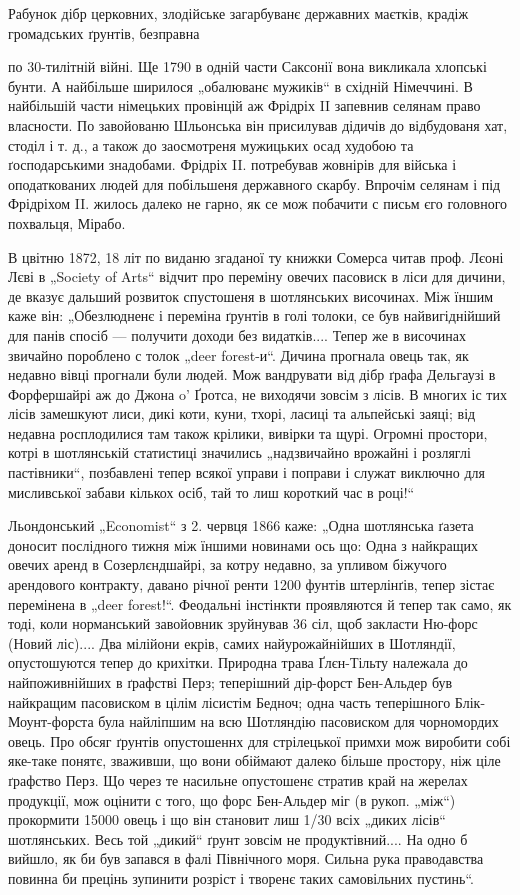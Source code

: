 Рабунок дібр церковних, злодійське загарбуванє державних маєтків, крадіж громадських ґрунтів,
безправна

по 30-тилітній війні. Ще 1790 в одній части Саксонії вона викликала хлопські бунти. А найбільше
ширилося „обалюванє мужиків“ в східній Німеччині. В найбільшій части німецьких провінцій аж Фрідріх
II запевнив селянам право власности. По завойованю Шльонська він присилував дідичів до відбудованя
хат, стоділ і т. д., а також до заосмотреня мужицьких осад худобою та ґосподарськими знадобами.
Фрідріх II. потребував жовнірів для війська і оподаткованих людей для побільшеня державного
скарбу. Впрочім селянам і під Фрідріхом II. жилось далеко не гарно, як се мож побачити с письм єго
головного похвальця, Мірабо.

В цвітню 1872, 18 літ по виданю згаданої ту книжки Сомерса читав проф. Лєоні Лєві в „Society of
Arts“ відчит про переміну овечих пасовиск в ліси для дичини, де вказує дальший розвиток спустошеня в
шотлянських височинах. Між їншим каже він: „Обезлюдненє і переміна ґрунтів в голі толоки, се був
найвигіднійший для панів спосіб — получити доходи без видатків.... Тепер же в височинах звичайно
пороблено с толок
„deer forest-и“. Дичина прогнала овець так, як недавно вівці прогнали були людей. Мож вандрувати від
дібр ґрафа Дельгаузі в Форфершайрі аж до Джона o' Ґротса, не виходячи зовсім з лісів. В многих іс
тих лісів замешкуют лиси, дикі коти, куни, тхорі, ласиці та альпейські заяці; від недавна
росплодилися там також крілики, вивірки та щурі. Огромні простори, котрі в шотлянській статистиці
значились „надзвичайно врожайні
і розляглі пастівники“, позбавлені тепер всякої управи і поправи і служат виключно для мисливської
забави кількох осіб, тай то лиш короткий час в році!“

Льондонський „Economist“ з 2. червця 1866 каже: „Одна шотлянська ґазета доносит послідного тижня між
їншими новинами ось що: Одна з найкращих овечих аренд в Созерлєндшайрі, за котру недавно, за упливом
біжучого арендового контракту, давано річної ренти 1200 фунтів штерлінґів, тепер зістає перемінена в
„deer forest!“. Феодальні інстінкти проявляются й тепер так само, як тоді, коли норманський
завойовник зруйнував 36 сіл, щоб закласти Ню-форс (Новий ліс).... Два мілійони екрів, самих
найурожайнійших в Шотляндії, опустошуются тепер до крихітки. Природна трава Ґлєн-Тільту належала до
найпоживнійших в ґрафстві Перз; теперішний дір-форст Бен-Альдер був найкращим пасовиском в цілім
лісистім Бедноч; одна часть теперішного Блік-Моунт-форста була найліпшим на всю Шотляндію пасовиском
для чорномордих овець. Про обсяг ґрунтів опустошеннх для стрілецької примхи мож виробити собі
яке-таке понятє, зваживши, що вони обіймают далеко більше простору, ніж ціле ґрафство Перз. Що через
те насильне опустошенє стратив край на жерелах продукції, мож оцінити с того, що форс Бен-Альдер міг
(в рукоп. „між“) прокормити 15000 овець і що він становит лиш 1/30 всіх „диких лісів“ шотлянських.
Весь той „дикий“ ґрунт зовсім не продуктівний.... На одно б вийшло, як би був запався в фалі
Північного моря. Сильна рука праводавства повинна би прецінь зупинити розріст і творенє таких
самовільних
пустинь“.
